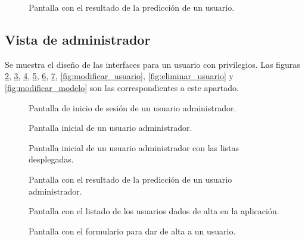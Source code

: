 \begin{figure}[h]
	\caption{Pantalla con el resultado de la predicción de un usuario.}
	\label{fig:resultado}
\end{figure}

\subsection{Vista de administrador}
Se muestra el diseño de las interfaces para un usuario con privilegios. Las figuras \ref{fig:inicio_de_sesion_admin}, \ref{fig:inicio_admin}, \ref{fig:inicio_1_admin}, \ref{fig:resultado_admin}, \ref{fig:gestionar_usuarios}, \ref{fig:agregar_usuario}, \ref{fig:modificar_usuario}, \ref{fig:eliminar_usuario} y \ref{fig:modificar_modelo} son las correspondientes a este apartado.
\begin{figure}[h]
	\caption{Pantalla de inicio de sesión de un usuario administrador.}
	\label{fig:inicio_de_sesion_admin}
\end{figure}

\begin{figure}[h]
	\caption{Pantalla inicial de un usuario administrador.}
	\label{fig:inicio_admin}
\end{figure}

\begin{figure}[h]
	\caption{Pantalla inicial de un usuario administrador con las listas desplegadas.}
	\label{fig:inicio_1_admin}
\end{figure}

\begin{figure}[h]
	\caption{Pantalla con el resultado de la predicción de un usuario administrador.}
	\label{fig:resultado_admin}
\end{figure}

\begin{figure}[h]
	\caption{Pantalla con el listado de los usuarios dados de alta en la aplicación.}
	\label{fig:gestionar_usuarios}
\end{figure}

\begin{figure}[h]
	\caption{Pantalla con el formulario para dar de alta a un usuario.}
	\label{fig:agregar_usuario}
\end{figure}

